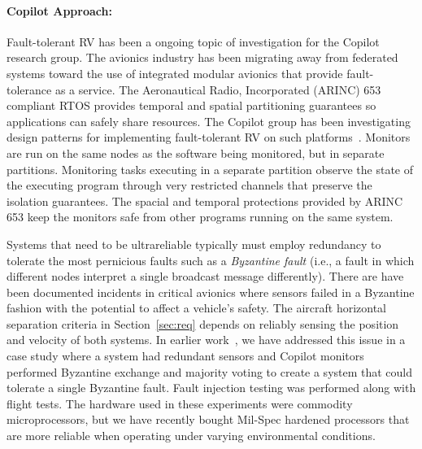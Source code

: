 \paragraph{Copilot Approach:} Fault-tolerant RV has been a ongoing
topic of investigation for the Copilot research group. The avionics
industry has been migrating away from federated systems toward the use
of integrated modular avionics that provide fault-tolerance as a
service.  The Aeronautical Radio, Incorporated (ARINC)
653~\cite{ARINC653} compliant RTOS
provides temporal and spatial partitioning guarantees so applications
can safely share resources.  The Copilot group has been investigating
design patterns for implementing fault-tolerant RV on such
platforms~\cite{Kaveh15}. Monitors are run on the same nodes as the
software being monitored, but in separate partitions. Monitoring tasks
executing in a separate partition observe the state of the executing
program through very restricted
channels that preserve the isolation guarantees.  The spacial and
temporal protections provided by ARINC 653 keep the monitors safe from
other programs running on the same system.

Systems that need to  be ultrareliable typically must employ redundancy to
tolerate the most pernicious faults such as a \emph{Byzantine fault}
(i.e., a fault in which different nodes interpret a single broadcast
message differently).  There are have been  documented incidents in
critical avionics  where sensors failed in a Byzantine fashion with
the potential to affect a vehicle's safety.  The aircraft horizontal separation criteria in
Section~\ref{sec:req} depends on reliably sensing the position and
velocity of both systems. In earlier work~\cite{pike-isse-13}, we have
 addressed this issue in a case study where a system had
redundant sensors and Copilot monitors performed Byzantine exchange and 
majority voting to create a system that could tolerate a single
Byzantine fault.  Fault injection testing was
performed along with flight tests.  The hardware used in these
experiments were commodity microprocessors, but we have recently
bought Mil-Spec hardened processors that are more reliable when operating
under varying environmental conditions.






